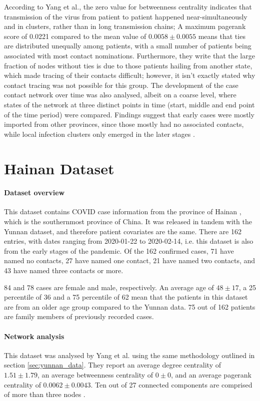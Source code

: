 According to Yang et al., the zero value for betweenness centrality indicates that transmission of the virus from patient to patient happened near-simultaneously and in clusters, rather than in long transmission chains; A maximum pagerank score of 0.0221 compared to the mean value of $0.0058\pm0.0055$ means that ties are distributed unequally among patients, with a small number of patients being associated with most contact nominations. Furthermore, they write that the large fraction of nodes without ties is due to those patients hailing from another state, which made tracing of their contacts difficult; however, it isn't exactly stated why contact tracing was not possible for this group. The development of the case contact network over time was also analysed, albeit on a coarse level, where states of the network at three distinct points in time (start, middle and end point of the time period) were compared. Findings suggest that early cases were mostly imported from other provinces, since those mostly had no associated contacts, while local infection clusters only emerged in the later stages \cite{hainan_publication}. 

\section{Hainan Dataset}
\label{sec:hainan_data}

\paragraph{Dataset overview} This dataset contains COVID case information from the province of Hainan \cite{hainan_data}, which is the southernmost province of China. It was released in tandem with the Yunnan dataset, and therefore patient covariates are the same. There are 162 entries, with dates ranging from 2020-01-22 to 2020-02-14, i.e. this dataset is also from the early stages of the pandemic. Of the 162 confirmed cases, 71 have named no contacts, 27 have named one contact, 21 have named two contacts, and 43 have named three contacts or more. 

84 and 78 cases are female and male, respectively. An average age of $48\pm17$, a 25 percentile of 36 and a 75 percentile of 62 mean that the patients in this dataset are from an older age group compared to the Yunnan data. 75 out of 162 patients are family members of previously recorded cases.

\paragraph{Network analysis} This dataset was analysed by Yang et al. using the same methodology outlined in section \ref{sec:yunnan_data}. They report an average degree centrality of $1.51\pm1.79$, an average betweenness centrality of $0\pm0$, and an average pagerank centrality of $0.0062\pm0.0043$. Ten out of 27 connected components are comprised of more than three nodes \cite{hainan_publication}. 

